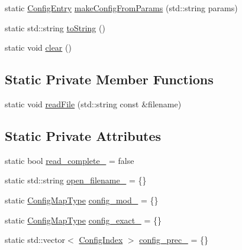 \begin{DoxyCompactItemize}
\item 
static \hyperlink{structvt_1_1vrt_1_1collection_1_1balance_1_1_config_entry}{Config\+Entry} \hyperlink{structvt_1_1vrt_1_1collection_1_1balance_1_1_read_l_b_config_a4022d7aaeb1bbe556e4ed4b8630ac38b}{make\+Config\+From\+Params} (std\+::string params)
\item 
static std\+::string \hyperlink{structvt_1_1vrt_1_1collection_1_1balance_1_1_read_l_b_config_a1d4f6c45f2b4118bdffb4f0a011f25b8}{to\+String} ()
\item 
static void \hyperlink{structvt_1_1vrt_1_1collection_1_1balance_1_1_read_l_b_config_a12418b6d3b3a6e9538810bf58d570dec}{clear} ()
\end{DoxyCompactItemize}
\subsection*{Static Private Member Functions}
\begin{DoxyCompactItemize}
\item 
static void \hyperlink{structvt_1_1vrt_1_1collection_1_1balance_1_1_read_l_b_config_aab5ffc23e5bd6002ad7ea83076871df5}{read\+File} (std\+::string const \&filename)
\end{DoxyCompactItemize}
\subsection*{Static Private Attributes}
\begin{DoxyCompactItemize}
\item 
static bool \hyperlink{structvt_1_1vrt_1_1collection_1_1balance_1_1_read_l_b_config_a1fcb6cf46a05f2b3bf3a3131f14310c0}{read\+\_\+complete\+\_\+} = false
\item 
static std\+::string \hyperlink{structvt_1_1vrt_1_1collection_1_1balance_1_1_read_l_b_config_ad312391a8868f40127765a236022979b}{open\+\_\+filename\+\_\+} = \{\}
\item 
static \hyperlink{structvt_1_1vrt_1_1collection_1_1balance_1_1_read_l_b_config_ad7babe539cf2171b9a9cee642b36a965}{Config\+Map\+Type} \hyperlink{structvt_1_1vrt_1_1collection_1_1balance_1_1_read_l_b_config_a7ba0036a147c6bb0a68d994ee727353f}{config\+\_\+mod\+\_\+} = \{\}
\item 
static \hyperlink{structvt_1_1vrt_1_1collection_1_1balance_1_1_read_l_b_config_ad7babe539cf2171b9a9cee642b36a965}{Config\+Map\+Type} \hyperlink{structvt_1_1vrt_1_1collection_1_1balance_1_1_read_l_b_config_af8edb18471dab4f0978fd3c5a03686d1}{config\+\_\+exact\+\_\+} = \{\}
\item 
static std\+::vector$<$ \hyperlink{namespacevt_1_1vrt_1_1collection_1_1balance_ac1bb9eee8129549177880dbb4e5f6a34}{Config\+Index} $>$ \hyperlink{structvt_1_1vrt_1_1collection_1_1balance_1_1_read_l_b_config_aa1772b9384bf1e0c7ee480c8d303b94f}{config\+\_\+prec\+\_\+} = \{\}
\end{DoxyCompactItemize}


